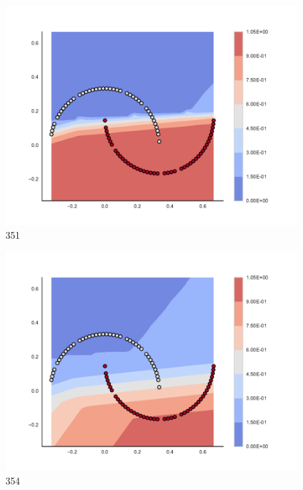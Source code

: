 \begin{subfigure}[b]{0.09\textwidth}
    \includegraphics[width=\textwidth]{img/convergence/351.pdf}
    \caption{351}
    \label{fig:convergence_351}
\end{subfigure}
%
\begin{subfigure}[b]{0.09\textwidth}
    \includegraphics[width=\textwidth]{img/convergence/354.pdf}
    \caption{354}
    \label{fig:convergence_354}
\end{subfigure}
%

